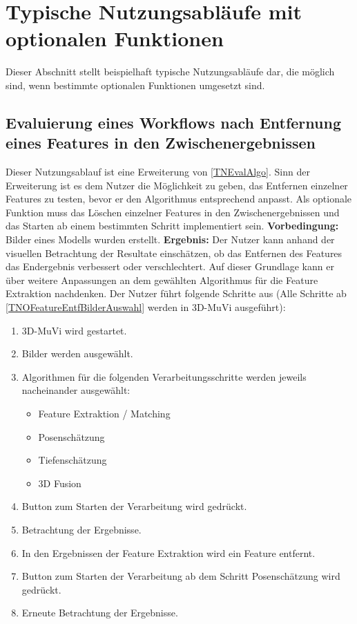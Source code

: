 \section{Typische Nutzungsabläufe mit optionalen Funktionen}

Dieser Abschnitt stellt beispielhaft typische Nutzungsabläufe dar, die möglich sind, wenn bestimmte optionalen Funktionen umgesetzt sind.

\subsection{Evaluierung eines Workflows nach Entfernung eines Features in den Zwischenergebnissen}
Dieser Nutzungsablauf ist eine Erweiterung von \ref{TNEvalAlgo}. Sinn der Erweiterung ist es dem Nutzer die Möglichkeit zu geben, das Entfernen einzelner Features zu testen, bevor er den Algorithmus entsprechend anpasst. Als optionale Funktion muss das Löschen einzelner Features in den Zwischenergebnissen und das Starten ab einem bestimmten Schritt implementiert sein. \newline
\textbf{Vorbedingung:} Bilder eines Modells wurden erstellt. \newline
\textbf{Ergebnis:} Der Nutzer kann anhand der visuellen Betrachtung der Resultate einschätzen, ob das Entfernen des Features das Endergebnis verbessert oder verschlechtert. Auf dieser Grundlage kann er über weitere Anpassungen an dem gewählten Algorithmus für die Feature Extraktion nachdenken. \newline
Der Nutzer führt folgende Schritte aus (Alle Schritte ab \ref{TNOFeatureEntfBilderAuswahl} werden in 3D-MuVi ausgeführt):
\begin{enumerate}
	\item 3D-MuVi wird gestartet.
	\item \label{TNOFeatureEntfBilderAuswahl} Bilder werden ausgewählt.
	\item Algorithmen für die folgenden Verarbeitungsschritte werden jeweils nacheinander ausgewählt:
	\begin{itemize}
		\item Feature Extraktion / Matching
		\item Posenschätzung
		\item Tiefenschätzung
		\item 3D Fusion
	\end{itemize}
	\item Button zum Starten der Verarbeitung wird gedrückt.
	\item Betrachtung der Ergebnisse.
	\item In den Ergebnissen der Feature Extraktion wird ein Feature entfernt.
	\item Button zum Starten der Verarbeitung ab dem Schritt Posenschätzung wird gedrückt.
	\item Erneute Betrachtung der Ergebnisse.
\end{enumerate}
